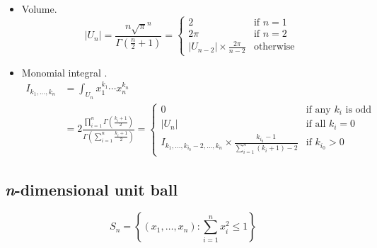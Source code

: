 \documentclass[draft]{scrartcl}
\begin{document}
\begin{itemize}
  \item Volume.
\begin{equation*}\label{ndimsphere}
  |U_n|
  = \frac{n \sqrt{\pi}^n}{\Gamma(\frac{n}{2}+1)}
  = \begin{cases}
    2&\text{if $n = 1$}\\
    2\pi&\text{if $n = 2$}\\
    |U_{n-2}| \times \frac{2\pi}{n - 2}&\text{otherwise}
  \end{cases}
\end{equation*}

  \item Monomial integral \cite{folland}.
\[
  \begin{split}
  I_{k_1,\dots,k_n}
  &= \int_{U_n} x_1^{k_1}\cdots x_n^{k_n}\\
  &= 2 \frac{\prod_{i=1}^n
    \Gamma\left(\frac{k_i+1}{2}\right)}{\Gamma\left(\sum_{i=1}^n\frac{k_i+1}{2}\right)}
  =\begin{cases}
    0&\text{if any $k_i$ is odd}\\
    |U_n|&\text{if all $k_i=0$}\\
    I_{k_1,\dots,k_{i_0}-2,\dots,k_n} \times \frac{k_{i_0} - 1}{\sum_{i=1}^n (k_i+1) - 2}&\text{if $k_{i_0} > 0$}
  \end{cases}
  \end{split}
\]
\end{itemize}


\subsection*{\textit{n}-dimensional unit ball}
\[
  S_n = \left\{(x_1,\dots,x_n): \sum_{i=1}^n x_i^2 \le 1\right\}
\]
\end{document}
